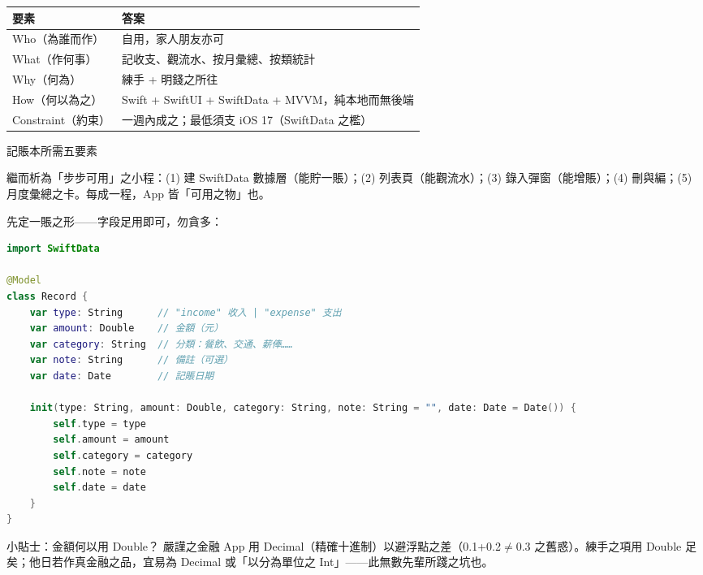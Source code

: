


\begin{center}
\begin{tabularx}{\linewidth}{|X|X|}
\hline
\textbf{要素} & \textbf{答案} \tabularnewline
\hline
Who（為誰而作） & 自用，家人朋友亦可 \tabularnewline
What（作何事） & 記收支、觀流水、按月彙總、按類統計 \tabularnewline
Why（何為） & 練手 + 明錢之所往 \tabularnewline
How（何以為之） & Swift + SwiftUI + SwiftData + MVVM，純本地而無後端 \tabularnewline
Constraint（約束） & 一週內成之；最低須支 iOS 17（SwiftData 之檻） \tabularnewline
\hline
\end{tabularx}
\end{center}

\begin{center}\small\color{gray}記賬本所需五要素\end{center}

繼而析為「步步可用」之小程：(1) 建 SwiftData 數據層（能貯一賬）；(2) 列表頁（能觀流水）；(3) 錄入彈窗（能增賬）；(4) 刪與編；(5) 月度彙總之卡。每成一程，App 皆「可用之物」也。


先定一賬之形——字段足用即可，勿貪多：

\begin{lstlisting}[language=Swift]
import SwiftData

@Model
class Record {
    var type: String      // "income" 收入 | "expense" 支出
    var amount: Double    // 金額（元）
    var category: String  // 分類：餐飲、交通、薪俸……
    var note: String      // 備註（可選）
    var date: Date        // 記賬日期

    init(type: String, amount: Double, category: String, note: String = "", date: Date = Date()) {
        self.type = type
        self.amount = amount
        self.category = category
        self.note = note
        self.date = date
    }
}
\end{lstlisting}

\begin{tcbinfo}{小貼士：金額何以用 Double？}
嚴謹之金融 App 用 Decimal（精確十進制）以避浮點之差（0.1+0.2$\neq$0.3 之舊惑）。練手之項用 Double 足矣；他日若作真金融之品，宜易為 Decimal 或「以分為單位之 Int」——此無數先輩所踐之坑也。

\end{tcbinfo}

